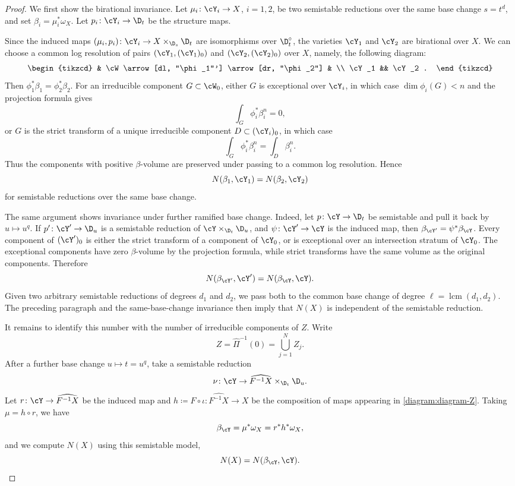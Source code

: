 \documentclass[12pt]{amsart}
\begin{document}
\begin{proof}
We first show the birational invariance. Let
\(\mu_i\colon \cY_i\to X\), \(i=1,2\), be two
semistable reductions over the same base change \(s=t^d\), and set
\(\beta_i=\mu_i^*\omega_X\). Let \(p_i\colon \cY_i\to\D_t\) be the structure maps.

Since the induced maps \((\mu_i,p_i)\colon \cY_i\to X\times_{\D_s}\D_t\)
are isomorphisms over \(\D_t^\circ\), the varieties \(\cY_1\) and
\(\cY_2\) are birational over \(X\).
We can
choose a common log resolution of pairs $(\cY_1, (\cY_1)_0)$ and $(\cY_2,(\cY_2)_0)$ over \(X\), namely, the following diagram:
\[
\begin{tikzcd}
& \cW \arrow[dl, "\phi_1"'] \arrow[dr, "\phi_2"] & \\
\cY_1 && \cY_2 .
\end{tikzcd}
\]
Then \(\phi_1^*\beta_1=\phi_2^*\beta_2\). For an irreducible component
\(G\subset \cW_0\), either \(G\) is exceptional over \(\cY_i\), in which
case \(\dim \phi_i(G)<n\) and the projection formula gives
\[
\int_G \phi_i^*\beta_i^n=0,
\]
or \(G\) is the strict transform of a unique irreducible component
\(D\subset (\cY_i)_0\), in which case
\[
\int_G \phi_i^*\beta_i^n=\int_D \beta_i^n .
\]
Thus the components with positive \(\beta\)-volume are preserved under
passing to a common log resolution. Hence
\[
N(\beta_1,\cY_1)=N(\beta_2,\cY_2)
\]
for semistable reductions over the same base change.

The same argument shows invariance under further ramified base change.
Indeed, let \(p\colon\cY\to\D_t\) be semistable and pull it back by
\(u\mapsto u^q\). If \(p'\colon\cY'\to\D_u\) is a semistable reduction
of \(\cY\times_{\D_t}\D_u\), and \(\psi\colon\cY'\to\cY\) is the induced map,
then \(\beta_{\cY'}=\psi^*\beta_\cY\). Every component of \((\cY')_0\) is
either the strict transform of a component of \(\cY_0\), or is exceptional
over an intersection stratum of \(\cY_0\). The exceptional components have
zero \(\beta\)-volume by the projection formula, while strict transforms
have the same volume as the original components. Therefore
\[
N(\beta_{\cY'},\cY')=N(\beta_\cY,\cY).
\]
Given two arbitrary semistable reductions of degrees \(d_1\) and \(d_2\),
we pass both to the common base change of degree
\(\ell=\operatorname{lcm}(d_1,d_2)\). The preceding paragraph and the
same-base-change invariance then imply that \(N(X)\) is independent of
the semistable reduction.

It remains to identify this number with the number of irreducible
components of \(Z\). Write
\[
Z=\widehat{\Pi}^{-1}(0)=\bigcup_{j=1}^N Z_j .
\]
After a further base change \(u\mapsto t=u^q\), take a semistable
reduction
\[
\nu\colon \cY\to \widehat{F^{-1}X}\times_{\D_t}\D_u .
\]
Let \(r\colon\cY\to\widehat{F^{-1}X}\) be the induced map and
\(h \coloneqq F \circ \iota \colon\widehat{F^{-1}X}\to X\) be the composition of maps appearing in \cref{diagram:diagram-Z}. Taking \(\mu=h\circ r\), we have
\[
\beta_\cY=\mu^*\omega_X=r^*h^*\omega_X,
\]
and we compute $N(X)$ using this semistable model,
\[
N(X)=N(\beta_\cY,\cY).
\]


\end{proof}
\end{document}
